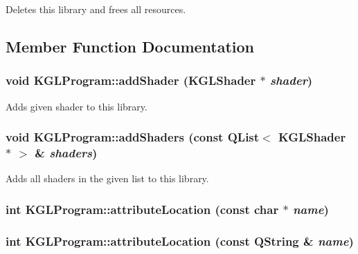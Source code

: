 Deletes this library and frees all resources. 

\subsection{Member Function Documentation}
\hypertarget{class_k_g_l_program_cb58b41949d3a88b66557f43196dcaba}{
\subsubsection[{addShader}]{\setlength{\rightskip}{0pt plus 5cm}void KGLProgram::addShader ({\bf KGLShader} $\ast$ {\em shader})}}
\label{class_k_g_l_program_cb58b41949d3a88b66557f43196dcaba}


Adds given shader to this library. \hypertarget{class_k_g_l_program_465ecaf07d2116b74bf892d40c7dc17a}{
\subsubsection[{addShaders}]{\setlength{\rightskip}{0pt plus 5cm}void KGLProgram::addShaders (const QList$<$ {\bf KGLShader} $\ast$ $>$ \& {\em shaders})}}
\label{class_k_g_l_program_465ecaf07d2116b74bf892d40c7dc17a}


Adds all shaders in the given list to this library. \hypertarget{class_k_g_l_program_237f2223b1ba1c80e90543d0523739c4}{
\subsubsection[{attributeLocation}]{\setlength{\rightskip}{0pt plus 5cm}int KGLProgram::attributeLocation (const char $\ast$ {\em name})}}
\label{class_k_g_l_program_237f2223b1ba1c80e90543d0523739c4}


\hypertarget{class_k_g_l_program_16d1cc930ef9585ec503fe935c4b6a9f}{
\subsubsection[{attributeLocation}]{\setlength{\rightskip}{0pt plus 5cm}int KGLProgram::attributeLocation (const QString \& {\em name})}}
\label{class_k_g_l_program_16d1cc930ef9585ec503fe935c4b6a9f}



